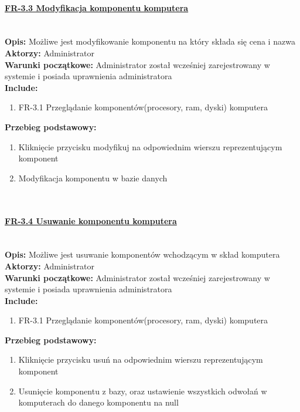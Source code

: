 \paragraph{\underline{FR-3.3 Modyfikacja komponentu komputera}}\mbox{}\\[1mm]
	\noindent\textbf{Opis:} Możliwe jest modyfikowanie komponentu na który składa się cena i nazwa\\
	\noindent\textbf{Aktorzy:} Administrator\\
	\textbf{Warunki początkowe:} Administrator został wcześniej zarejestrowany w systemie i posiada uprawnienia administratora\\
	\textbf{Include:} 
	\begin{enumerate}[noparskip]
		\item FR-3.1 Przeglądanie komponentów(procesory, ram, dyski) komputera
	\end{enumerate}
  \textbf{Przebieg podstawowy:}
	\begin{enumerate}[noparskip]
		\item Kliknięcie przycisku modyfikuj na odpowiednim wierszu reprezentującym komponent
		\item Modyfikacja komponentu w bazie danych
  \end{enumerate} \mbox{}\\[-11mm]

\paragraph{\underline{FR-3.4 Usuwanie komponentu komputera}}\mbox{}\\[1mm]
	\noindent\textbf{Opis:} Możliwe jest usuwanie komponentów wchodzącym w skład komputera\\
	\noindent\textbf{Aktorzy:} Administrator\\
	\textbf{Warunki początkowe:} Administrator został wcześniej zarejestrowany w systemie i posiada uprawnienia administratora\\
	\textbf{Include:} 
	\begin{enumerate}[noparskip]
		\item FR-3.1 Przeglądanie komponentów(procesory, ram, dyski) komputera
	\end{enumerate}
    \textbf{Przebieg podstawowy:}
	\begin{enumerate}[noparskip]
		\item Kliknięcie przycisku usuń na odpowiednim wierszu reprezentującym komponent
		\item Usunięcie komponentu z bazy, oraz ustawienie wszystkich odwołań w komputerach do danego komponentu na null
  \end{enumerate} \mbox{}\\[-11mm]

